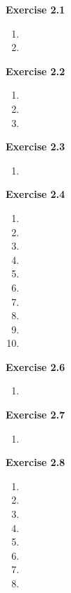 




\textbf{Exercise 2.1}
\begin{enumerate}
    \item 
    \item 
\end{enumerate}

\textbf{Exercise 2.2}
\begin{enumerate}
    \item 
    \item 
    \item 
\end{enumerate}

\textbf{Exercise 2.3}
\begin{enumerate}
    \item 
\end{enumerate}

\textbf{Exercise 2.4}
\begin{enumerate}
    \item 
    \item 
    \item 
    \item 
    \item 
    \item 
    \item 
    \item 
    \item 
    \item 
\end{enumerate}

\textbf{Exercise 2.6}
\begin{enumerate}
    \item 
\end{enumerate}

\textbf{Exercise 2.7}
\begin{enumerate}
    \item 
\end{enumerate}

\textbf{Exercise 2.8}
\begin{enumerate}
    \item 
    \item 
    \item 
    \item 
    \item 
    \item 
    \item 
    \item 
\end{enumerate}


